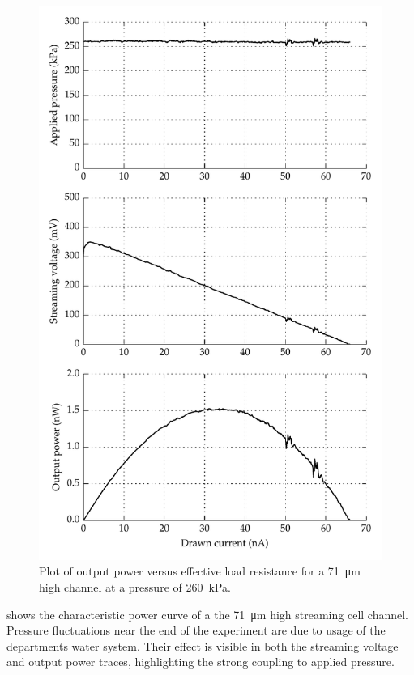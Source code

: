 \begin{figure}
    \centering
    \includegraphics{content/pt1/01-PowerHarvesting/graphics/graph_streamingCell_outputPower_resistanceSweep}
    \caption{\label{fig:streamingCell_maxPower}Plot of output power versus effective load resistance for a \SI{71}{\micro\metre} high channel at a pressure of \SI{260}{\kilo\pascal}.}
\end{figure}

 shows the characteristic power curve of a the \SI{71}{\micro\meter} high streaming cell channel.
Pressure fluctuations near the end of the experiment are due to usage of the departments water system.
Their effect is visible in both the streaming voltage and output power traces, highlighting the strong coupling to applied pressure.

